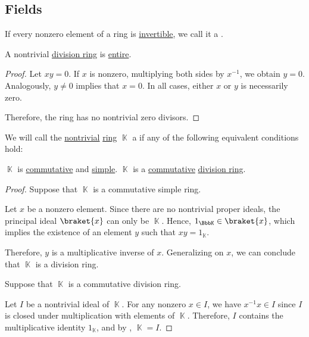 \subsection{Fields}\label{subsec:fields}

\begin{definition}\label{def:division_ring}
  If every nonzero element of a ring is \hyperref[def:divisibility/unit]{invertible}, we call it a .
\end{definition}

\begin{proposition}\label{thm:division_ring_is_entire}
  A nontrivial \hyperref[def:division_ring]{division ring} is \hyperref[def:entire_semiring]{entire}.
\end{proposition}
\begin{proof}
  Let \( xy = 0 \). If \( x \) is nonzero, multiplying both sides by \( x^{-1} \), we obtain \( y = 0 \). Analogously, \( y \neq 0 \) implies that \( x = 0 \). In all cases, either \( x \) or \( y \) is necessarily zero.

  Therefore, the ring has no nontrivial zero divisors.
\end{proof}

\begin{definition}\label{def:field}
  We will call the \hyperref[def:ring/trivial]{nontrivial} \hyperref[def:ring]{ring} \( \BbbK \) a  if any of the following equivalent conditions hold:
  \begin{thmenum}
     \( \BbbK \) is \hyperref[def:ring/commutative]{commutative} and \hyperref[def:ring/simple]{simple}.
     \( \BbbK \) is a \hyperref[def:ring/commutative]{commutative} \hyperref[def:division_ring]{division ring}.
  \end{thmenum}
\end{definition}
\begin{proof}
   Suppose that \( \BbbK \) is a commutative simple ring.

  Let \( x \) be a nonzero element. Since there are no nontrivial proper ideals, the principal ideal \( \braket{ x } \) can only be \( \BbbK \). Hence, \( 1_\BbbK \in \braket{ x } \), which implies the existence of an element \( y \) such that \( xy = 1_\BbbK \).

  Therefore, \( y \) is a multiplicative inverse of \( x \). Generalizing on \( x \), we can conclude that \( \BbbK \) is a division ring.

   Suppose that \( \BbbK \) is a commutative division ring.

  Let \( I \) be a nontrivial ideal of \( \BbbK \). For any nonzero \( x \in I \), we have \( x^{-1} x \in I \) since \( I \) is closed under multiplication with elements of \( \BbbK \). Therefore, \( I \) contains the multiplicative identity \( 1_\BbbK \), and by , \( \BbbK = I \).
\end{proof}

